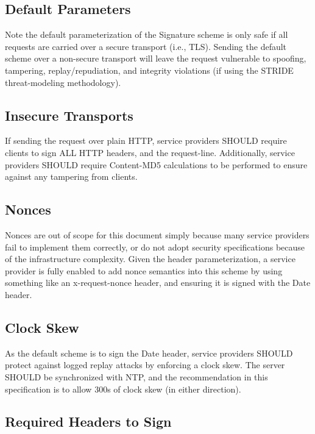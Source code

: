 \subsection*{Default Parameters}

Note the default parameterization of the {\ttfamily Signature} scheme is only safe if all requests are carried over a secure transport (i.\+e., T\+L\+S). Sending the default scheme over a non-\/secure transport will leave the request vulnerable to spoofing, tampering, replay/repudiation, and integrity violations (if using the S\+T\+R\+I\+D\+E threat-\/modeling methodology).

\subsection*{Insecure Transports}

If sending the request over plain H\+T\+T\+P, service providers S\+H\+O\+U\+L\+D require clients to sign A\+L\+L H\+T\+T\+P headers, and the {\ttfamily request-\/line}. Additionally, service providers S\+H\+O\+U\+L\+D require {\ttfamily Content-\/\+M\+D5} calculations to be performed to ensure against any tampering from clients.

\subsection*{Nonces}

Nonces are out of scope for this document simply because many service providers fail to implement them correctly, or do not adopt security specifications because of the infrastructure complexity. Given the {\ttfamily header} parameterization, a service provider is fully enabled to add nonce semantics into this scheme by using something like an {\ttfamily x-\/request-\/nonce} header, and ensuring it is signed with the {\ttfamily Date} header.

\subsection*{Clock Skew}

As the default scheme is to sign the {\ttfamily Date} header, service providers S\+H\+O\+U\+L\+D protect against logged replay attacks by enforcing a clock skew. The server S\+H\+O\+U\+L\+D be synchronized with N\+T\+P, and the recommendation in this specification is to allow 300s of clock skew (in either direction).

\subsection*{Required Headers to Sign}

